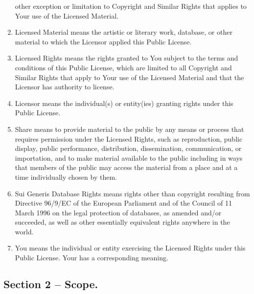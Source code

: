 \begin{enumerate}
  other exception or limitation to Copyright and Similar Rights that
  applies to Your use of the Licensed Material.
\item
  Licensed Material means the artistic or literary work, database, or
  other material to which the Licensor applied this Public License.
\item
  Licensed Rights means the rights granted to You subject to the terms
  and conditions of this Public License, which are limited to all
  Copyright and Similar Rights that apply to Your use of the Licensed
  Material and that the Licensor has authority to license.
\item
  Licensor means the individual(s) or entity(ies) granting rights under
  this Public License.
\item
  Share means to provide material to the public by any means or process
  that requires permission under the Licensed Rights, such as
  reproduction, public display, public performance, distribution,
  dissemination, communication, or importation, and to make material
  available to the public including in ways that members of the public
  may access the material from a place and at a time individually chosen
  by them.
\item
  Sui Generis Database Rights means rights other than copyright
  resulting from Directive 96/9/EC of the European Parliament and of the
  Council of 11 March 1996 on the legal protection of databases, as
  amended and/or succeeded, as well as other essentially equivalent
  rights anywhere in the world.
\item
  You means the individual or entity exercising the Licensed Rights
  under this Public License.
  Your has a corresponding meaning.
\end{enumerate}

\subsection*{Section 2 -- Scope.}

